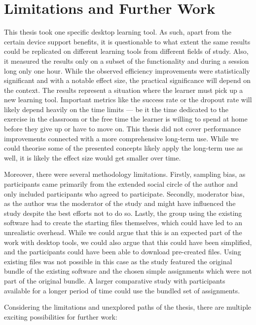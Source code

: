 {\section{Limitations and Further Work}

This thesis took one specific desktop learning tool.
As such, apart from the certain device support benefits, it is questionable to what extent the same results could be replicated on different learning tools from different fields of study.
Also, it measured the results only on a subset of the functionality and during a session long only one hour.
While the observed efficiency improvements were statistically significant and with a notable effect size, the practical significance will depend on the context.
The results represent a situation where the learner must pick up a new learning tool.
Important metrics like the success rate or the dropout rate will likely depend heavily on the time limits --- be it the time dedicated to the exercise in the classroom or the free time the learner is willing to spend at home before they give up or have to move on.
This thesis did not cover performance improvements connected with a more comprehensive long-term use.
While we could theorise some of the presented concepts likely apply the long-term use as well, it is likely the effect size would get smaller over time.

Moreover, there were several methodology limitations.
Firstly, sampling bias, as participants came primarily from the extended social circle of the author and only included participants who agreed to participate.
Secondly, moderator bias, as the author was the moderator of the study and might have influenced the study despite the best efforts not to do so.
Lastly, the group using the existing software had to create the starting files themselves, which could have led to an unrealistic overhead.
While we could argue that this is an expected part of the work with desktop tools, we could also argue that this could have been simplified, and the participants could have been able to download pre-created files.
Using existing files was not possible in this case as the study featured the original bundle of the existing software and the chosen simple assignments which were not part of the original bundle.
A larger comparative study with participants available for a longer period of time could use the bundled set of assignments.

Considering the limitations and unexplored paths of the thesis, there are multiple exciting possibilities for further work:

}
